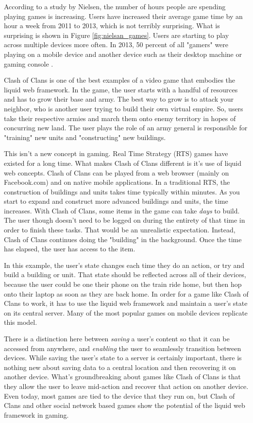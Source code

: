 \documentclass[12pt]{article}
\begin{document}
According to a study by Nielsen, the number of hours people are spending playing games is increasing.  Users have increased their average game time by an hour a week from 2011 to 2013, which is not terribly surprising.  What is surprising is shown in Figure \ref{fig:nielsan_games}.  Users are starting to play across multiple devices more often.  In 2013, 50 percent of all "gamers" were playing on a mobile device and another device such as their desktop machine or gaming console \cite{nielsan_games}.

Clash of Clans is one of the best examples of a video game that embodies the liquid web framework.  In the game, the user starts with a handful of resources and has to grow their base and army.  The best way to grow is to attack your neighbor, who is another user trying to build their own virtual empire.  So, users take their respective armies and march them onto enemy territory in hopes of concurring new land.  The user plays the role of an army general is responsible for "training" new units and "constructing" new buildings.

This isn't a new concept in gaming.  Real Time Strategy (RTS) games have existed for a long time.  What makes Clash of Clans different is it's use of liquid web concepts.  Clash of Clans can be played from a web browser (mainly on Facebook.com) and on native mobile applications.  In a traditional RTS, the construction of buildings and units takes time typically within minutes.  As you start to expand and construct more advanced buildings and units, the time increases.  With Clash of Clans, some items in the game can take \textit{days} to build.  The user though doesn't need to be logged on during the entirety of that time in order to finish these tasks.  That would be an unrealistic expectation.  Instead, Clash of Clans continues doing the "building" in the background.  Once the time has elapsed, the user has access to the item.

In this example, the user's state changes each time they do an action, or try and build a building or unit.  That state should be reflected across all of their devices, because the user could be one their phone on the train ride home, but then hop onto their laptop as soon as they are back home.  In order for a game like Clash of Clans to work, it has to use the liquid web framework and maintain a user's state on its central server.  Many of the most popular games on mobile devices replicate this model.

There is a distinction here between \textit{saving} a user's content so that it can be accessed from anywhere, and \textit{enabling} the user to seamlessly transition between devices.  While saving the user's state to a server is certainly important, there is nothing new about saving data to a central location and then recovering it on another device.  What's groundbreaking about games like Clash of Clans is that they allow the user to leave mid-action and recover that action on another device.  Even today, most games are tied to the device that they run on, but Clash of Clans and other social network based games show the potential of the liquid web framework in gaming.
\end{document}
